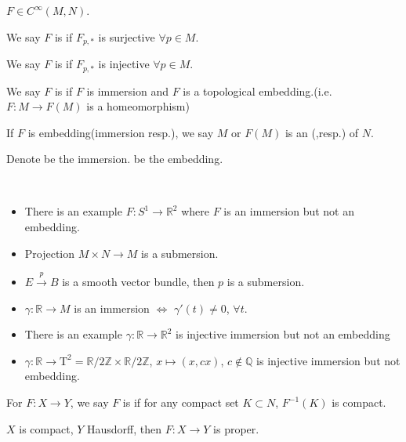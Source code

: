 \begin{definition}
     $ F\in C^\infty(M,N) $. 
     
     We say  $ F $ is  if  $ F_{p,*} $ is surjective $ \forall p\in M $.
     
     We say  $ F $ is  if  $ F_{p,*} $ is injective $ \forall p\in M $.

     We say  $ F $ is  if  $ F $ is  immersion and  $ F $ is a topological embedding.(i.e.  $ F:M\rightarrow F(M) $ is a homeomorphism) 

     If  $ F $ is embedding(immersion resp.), we say  $ M $ or  $ F(M) $ is an (,resp.) of  $ N $.   
     
     Denote   be the immersion.  be the embedding.
\end{definition}
\begin{example}
    \,\begin{itemize}
        \item There is an example  $ F:S^1\rightarrow\mathbb{R}^2 $ where  $ F $ is an immersion but not an embedding.
        \item  Projection $ M\times N\rightarrow M $ is a submersion.
        \item  $ E\xrightarrow{p}B $ is a smooth vector bundle, then  $ p $ is a submersion.
        \item  $ \gamma:\mathbb{R}\rightarrow M $ is an immersion $ \Leftrightarrow $ $ \gamma'(t)\not=0 $,  $ \forall t $.
        \item There is an example  $ \gamma:\mathbb{R}\rightarrow \mathbb{R}^2 $ is injective immersion but not an embedding   
        \item  $ \gamma:\mathbb{R}\rightarrow \mathrm{T}^2=\mathbb{R}/2\mathbb{Z}\times   \mathbb{R}/2\mathbb{Z} $,  $ x\mapsto (x,cx) $,  $ c\not\in \mathbb{Q} $ is injective immersion but not embedding.         
    \end{itemize}
\end{example}
\begin{definition}
    For  $ F:X\rightarrow Y $, we say  $ F $ is  if for any compact set  $ K\subset N $,  $ F^{-1}(K) $ is compact.    
\end{definition}
\begin{lemma}
     $ X $ is compact,  $ Y $ Hausdorff, then  $ F:X\rightarrow Y $ is proper.  
\end{lemma}
